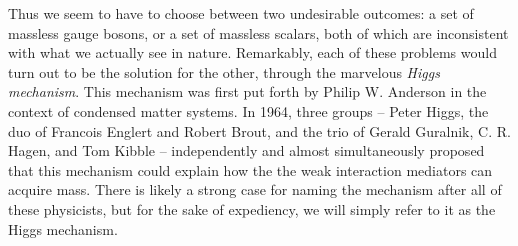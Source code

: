 Thus we seem to have to choose between two undesirable outcomes: a set of massless gauge bosons, or a set of massless scalars, both of which are inconsistent with what we actually see in nature. Remarkably, each of these problems would turn out to be the solution for the other, through the marvelous \emph{Higgs mechanism}. This mechanism was first put forth by Philip W. Anderson in the context of condensed matter systems. In 1964, three groups -- Peter Higgs, the duo of Francois Englert and Robert Brout, and the trio of Gerald Guralnik, C. R. Hagen, and Tom Kibble -- independently and almost simultaneously proposed that this mechanism could explain how the the weak interaction mediators can acquire mass. There is likely a strong case for naming the mechanism after all of these physicists, but for the sake of expediency, we will simply refer to it as the Higgs mechanism.

